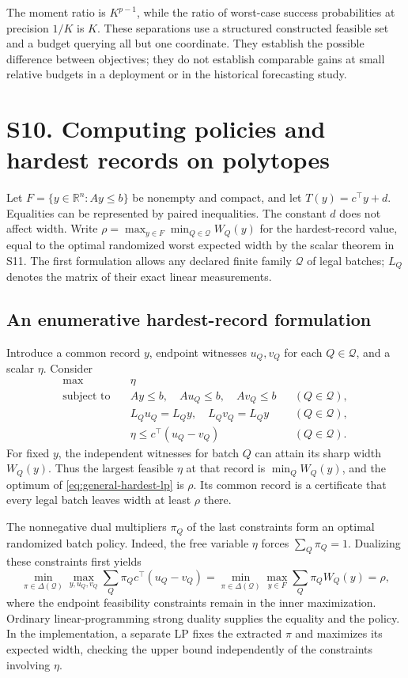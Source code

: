 The moment ratio is $K^{p-1}$, while the ratio of worst-case success
probabilities at precision $1/K$ is $K$. These separations use a
structured constructed feasible set and a budget querying all but one
coordinate. They establish the possible difference between objectives;
they do not establish comparable gains at small relative budgets in a
deployment or in the historical forecasting study.
\section{S10. Computing policies and hardest records on polytopes}\label{sec:general-algorithms}
Let $F=\{y\in\mathbb R^n:Ay\le b\}$ be nonempty and compact, and let
$T(y)=c^\top y+d$. Equalities can be represented by paired inequalities.
The constant $d$ does not affect width. Write $\rho=\max_{y\in F}\min_{Q\in\mathcal Q}W_Q(y)$ for the hardest-record value, equal to the optimal randomized worst expected width by the scalar theorem in S11. The first formulation allows any
declared finite family $\mathcal Q$ of legal batches; $L_Q$ denotes the matrix
of their exact linear measurements.

\subsection{An enumerative hardest-record formulation}
Introduce a common record $y$, endpoint witnesses $u_Q,v_Q$ for each
$Q\in\mathcal Q$, and a scalar $\eta$. Consider
\begin{equation}\label{eq:general-hardest-lp}
\begin{aligned}
\max\quad &\eta\\
\text{subject to}\quad &Ay\le b,\quad Au_Q\le b,\quad Av_Q\le b
                         &&(Q\in\mathcal Q),\\
&L_Qu_Q=L_Qy,\quad L_Qv_Q=L_Qy &&(Q\in\mathcal Q),\\
&\eta\le c^\top(u_Q-v_Q) &&(Q\in\mathcal Q).
\end{aligned}
\end{equation}
For fixed $y$, the independent witnesses for batch $Q$ can attain its sharp
width $W_Q(y)$. Thus the largest feasible $\eta$ at that record is
$\min_Q W_Q(y)$, and the optimum of \eqref{eq:general-hardest-lp} is $\rho$.
Its common record is a certificate that every legal batch leaves width at
least $\rho$ there.

The nonnegative dual multipliers $\pi_Q$ of the last constraints form an
optimal randomized batch policy. Indeed, the free variable $\eta$ forces
$\sum_Q\pi_Q=1$. Dualizing these constraints first yields
\[
\min_{\pi\in\Delta(\mathcal Q)}
 \max_{y,u_Q,v_Q}\sum_Q\pi_Qc^\top(u_Q-v_Q)
 =\min_{\pi\in\Delta(\mathcal Q)}\max_{y\in F}
       \sum_Q\pi_Q W_Q(y)=\rho,
\]
where the endpoint feasibility constraints remain in the inner maximization.
Ordinary linear-programming strong duality supplies the equality and the
policy. In the implementation, a separate
LP fixes the extracted $\pi$ and maximizes its expected width, checking the
upper bound independently of the constraints involving $\eta$.

